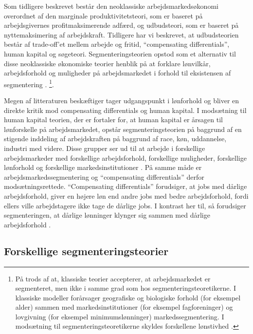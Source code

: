 Som tidligere beskrevet består den neoklassiske arbejdsmarkedsøkonomi overordnet af den marginale produktivitetsteori, som er baseret på arbejdsgivernes profitmaksimerende adfærd, og udbudsteori, som er baseret på nyttemaksimering af arbejdskraft. Tidligere har vi beskrevet, at udbudsteorien består af trade-off'et mellem arbejde og fritid, “compensating differentials”, human kapital og søgeteori. Segmenteringsteorien opstod som et alternativ til disse neoklassiske økonomiske teorier henblik på at forklare lønvilkår, arbejdsforhold og muligheder på arbejdsmarkedet i forhold til eksistensen af segmentering \parencite[69]{Doeringer1971} \parencite[95]{Leontaridi1998} \parencite[1216]{Cain1976} \parencite[359]{Reich1973} \parencite[1180]{Daw2012}. %
\footnote{På trods af at, klassiske teorier accepterer, at arbejdsmarkedet er segmenteret, men ikke i samme grad som hos segmenteringsteoretikerne. I klassiske modeller forårsager geografiske og biologiske forhold (for eksempel alder) sammen med markedsinstitutioner (for eksempel fagforeninger) og lovgivning (for eksempel minimumslønninger) markedssegmentering. I modsætning til segmenteringsteoretikerne skyldes forskellene lønstivhed \parencite[95]{Leontaridi1998}.}.

Megen af litteraturen beskæftiger tager udgangspunkt i lønforhold og bliver en direkte kritik mod compensating differentials og human kapital. I modsætning til human kapital teorien, der er fortaler for, at human kapital er årsagen til lønforskelle på arbejdsmarkedet, opstår segmenteringsteorien på baggrund af en stigende inddeling af arbejdskraften på baggrund af race, køn, uddannelse, industri med videre. Disse grupper ser ud til at arbejde i forskellige arbejdsmarkeder med forskellige arbejdsforhold, forskellige muligheder, forskellige lønforhold og forskellige markedsinstitutioner \parencite[359]{Reich1973}. På samme måde er arbejdsmarkedssegmentering og “compensating differentials” derfor modsætningsrettede. “Compensating differentials” forudsiger, at jobs med dårlige arbejdsforhold, giver en højere løn end andre jobs med bedre arbejdsforhold, fordi ellers ville arbejdstagere ikke tage de dårlige jobs. I kontrast her til, så forudsiger segmenteringen, at dårlige lønninger klynger sig sammen med dårlige arbejdsforhold \parencite[1180]{Daw2012}.


\subsection{Forskellige segmenteringsteorier}

